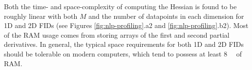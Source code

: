 Both the time- and space-complexity of computing the Hessian is found to be
roughly linear with both $M$ and the number of datapoints in each dimension
for \ac{1D} and \ac{2D} \acp{FID} (see Figures \ref{fig:nlp-profiling}.a2 and
\ref{fig:nlp-profiling}.b2). Most of the \ac{RAM} usage comes from storing
arrays of the first and second partial derivatives. In general, the typical
space requirements for both \ac{1D} and \ac{2D} \acp{FID} should be tolerable
on modern computers, which tend to possess at least \qty{8}{\gibi\byte} of
\ac{RAM}.
